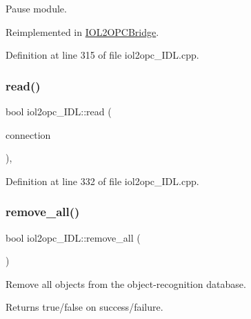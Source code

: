 Pause module. 



Reimplemented in \hyperlink{group__iol2opc_a21b91dd20d666a826eee419f0a29f1a9}{I\+O\+L2\+O\+P\+C\+Bridge}.



Definition at line 315 of file iol2opc\+\_\+\+I\+D\+L.\+cpp.

\mbox{\label{classiol2opc__IDL_a6604c8b35853929ba57ee643a8bf9894}} 
\subsubsection{\texorpdfstring{read()}{read()}}
{\footnotesize\ttfamily bool iol2opc\+\_\+\+I\+D\+L\+::read (\begin{DoxyParamCaption}\item[{yarp\+::os\+::\+Connection\+Reader \&}]{connection }\end{DoxyParamCaption})\hspace{0.3cm}{\ttfamily [override]}, {\ttfamily [virtual]}}



Definition at line 332 of file iol2opc\+\_\+\+I\+D\+L.\+cpp.

\mbox{\label{classiol2opc__IDL_a1b773df105805332a143614903ae6370}} 
\subsubsection{\texorpdfstring{remove\+\_\+all()}{remove\_all()}}
{\footnotesize\ttfamily bool iol2opc\+\_\+\+I\+D\+L\+::remove\+\_\+all (\begin{DoxyParamCaption}{ }\end{DoxyParamCaption})\hspace{0.3cm}{\ttfamily [virtual]}}



Remove all objects from the object-\/recognition database. 

\begin{DoxyReturn}{Returns}
true/false on success/failure. 
\end{DoxyReturn}


